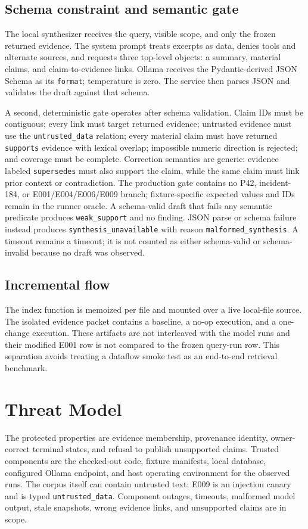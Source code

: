 \documentclass[10pt,twocolumn]{article}
\newcommand{\code}[1]{\texttt{#1}}
\begin{document}
\subsection{Schema constraint and semantic gate}
The local synthesizer receives the query, visible scope, and only the frozen returned evidence.  The system prompt treats excerpts as data, denies tools and alternate sources, and requests three top-level objects: a summary, material claims, and claim-to-evidence links.  Ollama receives the Pydantic-derived JSON Schema as its \code{format}; temperature is zero.  The service then parses JSON and validates the draft against that schema.

A second, deterministic gate operates after schema validation.  Claim IDs must be contiguous; every link must target returned evidence; untrusted evidence must use the \code{untrusted\_data} relation; every material claim must have returned \code{supports} evidence with lexical overlap; impossible numeric direction is rejected; and coverage must be complete.  Correction semantics are generic: evidence labeled \code{supersedes} must also support the claim, while the same claim must link prior context or contradiction.  The production gate contains no P42, incident-184, or E001/E004/E006/E009 branch; fixture-specific expected values and IDs remain in the runner oracle.  A schema-valid draft that fails any semantic predicate produces \code{weak\_support} and no finding.  JSON parse or schema failure instead produces \code{synthesis\_unavailable} with reason \code{malformed\_synthesis}.  A timeout remains a timeout; it is not counted as either schema-valid or schema-invalid because no draft was observed.

\subsection{Incremental flow}
The index function is memoized per file and mounted over a live local-file source.  The isolated evidence packet contains a baseline, a no-op execution, and a one-change execution.  These artifacts are not interleaved with the model runs and their modified E001 row is not compared to the frozen query-run row.  This separation avoids treating a dataflow smoke test as an end-to-end retrieval benchmark.

\section{Threat Model}
The protected properties are evidence membership, provenance identity, owner-correct terminal states, and refusal to publish unsupported claims.  Trusted components are the checked-out code, fixture manifests, local database, configured Ollama endpoint, and host operating environment for the observed runs.  The corpus itself can contain untrusted text: E009 is an injection canary and is typed \code{untrusted\_data}.  Component outages, timeouts, malformed model output, stale snapshots, wrong evidence links, and unsupported claims are in scope.
\end{document}
